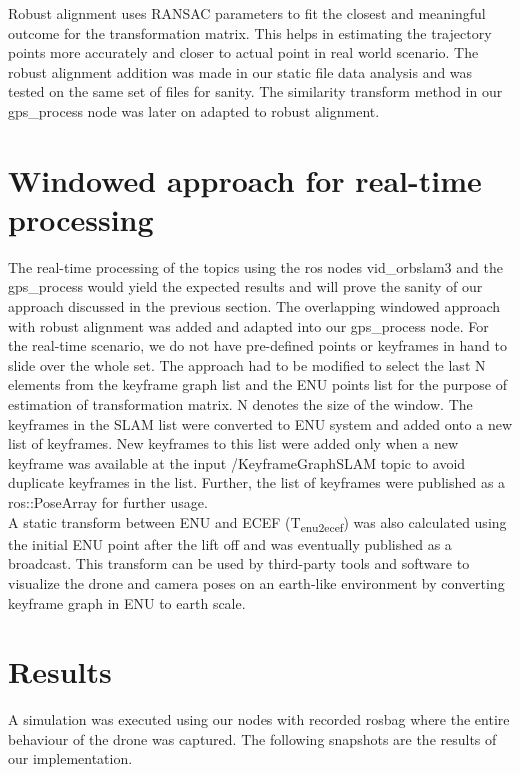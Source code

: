 Robust alignment uses RANSAC parameters to fit the closest and meaningful outcome for the transformation matrix. This helps in estimating the trajectory points more accurately and closer to actual point in real world scenario. The robust alignment addition was made in our static file data analysis and was tested on the same set of files for sanity. The similarity transform method in our gps\_process node was later on adapted to robust alignment.  

\section{Windowed approach for real-time processing}
\label{sec:windowapproachrealtime}
The real-time processing of the topics using the ros nodes vid\_orbslam3 and the gps\_process would yield the expected results and will prove the sanity of our approach discussed in the previous section. The overlapping windowed approach with robust alignment was added and adapted into our gps\_process node. For the real-time scenario, we do not have pre-defined points or keyframes in hand to slide over the whole set. The approach had to be modified to select the last N elements from the keyframe graph list and the ENU points list for the purpose of estimation of transformation matrix. N denotes the size of the window. The keyframes in the SLAM list were converted to ENU system and added onto a new list of keyframes. New keyframes to this list were added only when a new keyframe was available at the input /KeyframeGraphSLAM topic to avoid duplicate keyframes in the list. Further, the list of keyframes were published as a ros::PoseArray for further usage.\\

A static transform between ENU and ECEF (T\textsubscript{enu2ecef}) was also calculated using the initial ENU point after the lift off and was eventually published as a broadcast. This transform can be used by third-party tools and software to visualize the drone and camera poses on an earth-like environment by converting keyframe graph in ENU to earth scale.

\newpage

\section{Results}
\label{sec:results}
A simulation was executed using our nodes with recorded rosbag where the entire behaviour of the drone was captured. The following snapshots are the results of our implementation.

